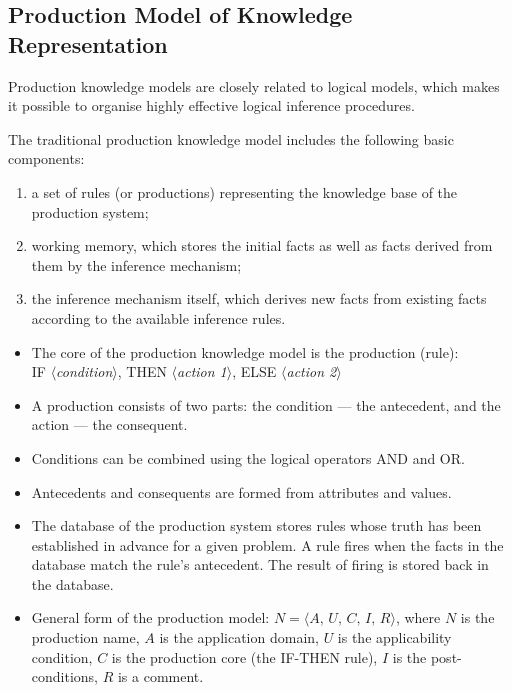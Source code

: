 \documentclass[a4paper,final]{article}
\begin{document}
\subsection{Production Model of Knowledge Representation}

Production knowledge models are closely related to logical models, which makes it possible to organise highly effective logical inference procedures.

The traditional production knowledge model includes the following basic components:

\begin{enumerate}
	\item a set of rules (or productions) representing the knowledge base of the production system;
	\item working memory, which stores the initial facts as well as facts derived from them by the inference mechanism;
	\item the inference mechanism itself, which derives new facts from existing facts according to the available inference rules.
\end{enumerate}

\begin{itemize}
	\item The core of the production knowledge model is the production (rule):\\[4pt]
	IF $\langle$\textit{condition}$\rangle$,\; THEN $\langle$\textit{action 1}$\rangle$,\; ELSE $\langle$\textit{action 2}$\rangle$

	\item A production consists of two parts: the condition --- the antecedent, and the action --- the consequent.

	\item Conditions can be combined using the logical operators AND and OR.

	\item Antecedents and consequents are formed from attributes and values.

	\item The database of the production system stores rules whose truth has been established in advance for a given problem. A rule fires when the facts in the database match the rule's antecedent. The result of firing is stored back in the database.

	\item General form of the production model: $N = \langle A,\, U,\, C,\, I,\, R \rangle$, where $N$ is the production name, $A$ is the application domain, $U$ is the applicability condition, $C$ is the production core (the IF-THEN rule), $I$ is the post-conditions, $R$ is a comment.
\end{itemize}
\end{document}

